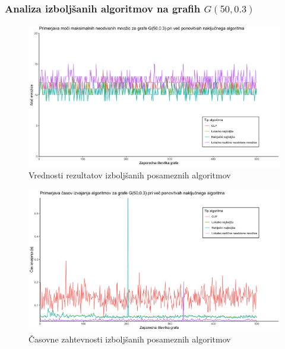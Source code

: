 \documentclass[a4paper, 12pt]{article}
\begin{document}
\newpage

\subsubsection{Analiza izboljšanih algoritmov na grafih $G(50, 0.3)$}

\begin{figure}[h!]
	\begin{center}
		\includegraphics[scale=0.10]{R_koda/pon-moc-maxi.png}
		\caption{Vrednosti rezultatov izboljšanih posameznih algoritmov}
	\end{center}
\end{figure}

\begin{figure}[h!]
	\begin{center}
		\includegraphics[scale=0.10]{R_koda/pon-casi-maxi.png}
		\caption{Časovne zahtevnosti izboljšanih posameznih algoritmov}
	\end{center}
\end{figure}
\end{document}
